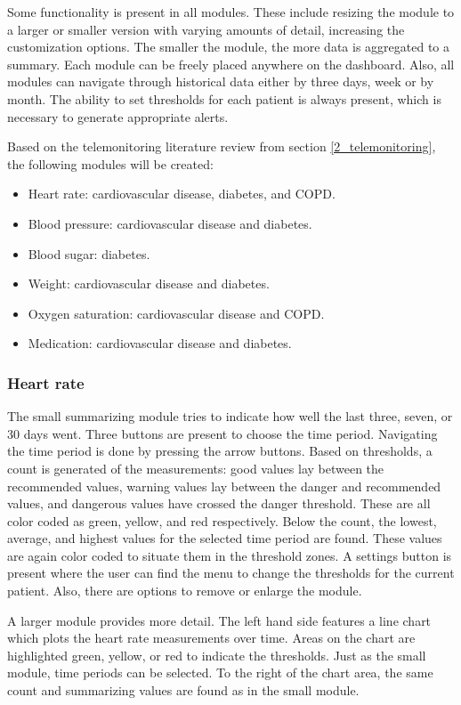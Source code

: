     Some functionality is present in all modules. These include resizing the module to a larger or smaller version with varying amounts of detail, increasing the customization options. The smaller the module, the more data is aggregated to a summary. Each module can be freely placed anywhere on the dashboard. Also, all modules can navigate through historical data either by three days, week or by month. The ability to set thresholds for each patient is always present, which is necessary to generate appropriate alerts.

    Based on the telemonitoring literature review from section \ref{2_telemonitoring}, the following modules will be created:
    \begin{itemize}
        \item Heart rate: cardiovascular disease, diabetes, and COPD.
        \item Blood pressure: cardiovascular disease and diabetes.
        \item Blood sugar: diabetes.
        \item Weight: cardiovascular disease and diabetes.
        \item Oxygen saturation: cardiovascular disease and COPD.
        \item Medication: cardiovascular disease and diabetes.
    \end{itemize}

        \subsubsection{Heart rate}

        The small summarizing module tries to indicate how well the last three, seven, or 30 days went. Three buttons are present to choose the time period. Navigating the time period is done by pressing the arrow buttons. Based on thresholds, a count is generated of the measurements: good values lay between the recommended values, warning values lay between the danger and recommended values, and dangerous values have crossed the danger threshold. These are all color coded as green, yellow, and red respectively. Below the count, the lowest, average, and highest values for the selected time period are found. These values are again color coded to situate them in the threshold zones. A settings button is present where the user can find the menu to change the thresholds for the current patient. Also, there are options to remove or enlarge the module.

        A larger module provides more detail. The left hand side features a line chart which plots the heart rate measurements over time. Areas on the chart are highlighted green, yellow, or red to indicate the thresholds. Just as the small module, time periods can be selected. To the right of the chart area, the same count and summarizing values are found as in the small module.

